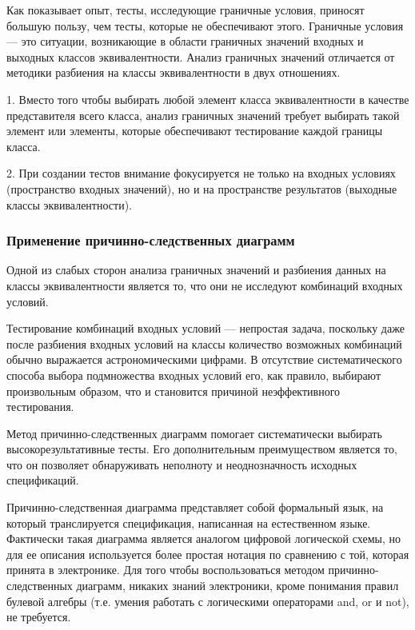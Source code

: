 \documentclass[12pt]{article}
\begin{document}
Как показывает опыт, тесты, исследующие граничные условия, приносят большую пользу, чем тесты, которые не обеспечивают этого. Граничные условия — это ситуации, возникающие в области гранич­ных значений входных и выходных классов эквивалентности. Анализ гра­ничных значений отличается от методики разбиения на классы эквивалент­ности в двух отношениях.

1. Вместо того чтобы выбирать любой элемент класса эквивалентности в качестве представителя всего класса, анализ граничных значений тре­бует выбирать такой элемент или элементы, которые обеспечивают те­стирование каждой границы класса.

2. При создании тестов внимание фокусируется не только на входных условиях (пространство входных значений), но и на пространстве результатов (выходные классы эквивалентности).


\subsubsection{Применение причинно-следственных диаграмм}

Одной из слабых сторон анализа граничных значений и разбиения дан­ных на классы эквивалентности является то, что они не исследуют комби­наций входных условий.

Тестирование комбинаций входных условий — непростая задача, посколь­ку даже после разбиения входных условий на классы количество возможных комбинаций обычно выражается астрономическими цифрами. В отсутствие систематического способа выбора подмножества входных условий его, как правило, выбирают произвольным образом, что и становится причиной не­эффективного тестирования.




Метод причинно-следственных диаграмм   помогает систематически выбирать высокорезультативные тесты. Его дополнительным преимуществом является то, что он позволя­ет обнаруживать неполноту и неоднозначность исходных спецификаций.

Причинно-следственная диаграмма представляет собой формальный язык, на который транслируется спецификация, написанная на естествен­ном языке. Фактически такая диаграмма является аналогом цифровой логи­ческой схемы, но для ее описания используется более простая нотация по
сравнению с той, которая принята в электронике. Для того чтобы восполь­зоваться методом причинно-следственных диаграмм, никаких знаний элек­троники, кроме понимания правил булевой алгебры (т.е. умения работать с логическими операторами and, or и not), не требуется.
\end{document}
